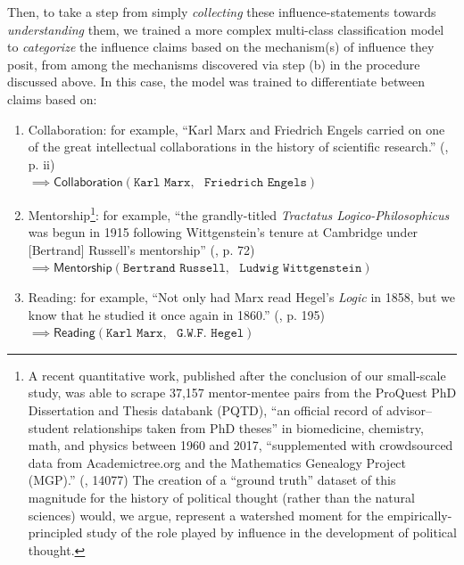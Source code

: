 \documentclass[11pt]{article}
\newcommand{\entity}[1]{\texttt{#1}}
\begin{document}
Then, to take a step from simply \textit{collecting} these influence-statements towards \textit{understanding} them, we trained a more complex multi-class classification model to \textit{categorize} the influence claims based on the mechanism(s) of influence they posit, from among the mechanisms discovered via step (b) in the procedure discussed above. In this case, the model was trained to differentiate between claims based on:
\begin{enumerate}
	\item \textsf{Collaboration}: for example, ``Karl Marx and Friedrich Engels carried on one of the great intellectual collaborations in the history of scientific research.'' (\cite{gandy_marx_1979}, p. ii) \\
	$\implies \textsf{Collaboration}(\entity{Karl Marx}, \text{ }\entity{Friedrich Engels})$
	
	\item \textsf{Mentorship}\footnote{A recent quantitative work, published after the conclusion of our small-scale study, was able to scrape 37,157 mentor-mentee pairs from the ProQuest PhD Dissertation and Thesis databank (PQTD), ``an official record of advisor–student relationships taken from PhD theses'' in biomedicine, chemistry, math, and physics between 1960 and 2017, ``supplemented with crowdsourced data from Academictree.org and the Mathematics Genealogy Project (MGP).'' (\cite{ma_mentorship_2020}, 14077) The creation of a ``ground truth'' dataset of this magnitude for the history of political thought (rather than the natural sciences) would, we argue, represent a watershed moment for the empirically-principled study of the role played by influence in the development of political thought.}: for example, ``the grandly-titled \textit{Tractatus Logico-Philosophicus} was begun in 1915 following Wittgenstein's tenure at Cambridge under [Bertrand] Russell's mentorship'' (\cite{wright_schoenberg_2006}, p. 72) \\
	$\implies \textsf{Mentorship}(\entity{Bertrand Russell},\text{ }\entity{Ludwig Wittgenstein})$
	
	\item \textsf{Reading}: for example, ``Not only had Marx read Hegel's \textit{Logic} in 1858, but we know that he studied it once again in 1860.'' (\cite{dussel_unknown_2002}, p. 195) \\
	$\implies \textsf{Reading}(\entity{Karl Marx},\text{ } \entity{G.W.F. Hegel})$
	

\end{enumerate}
\end{document}
